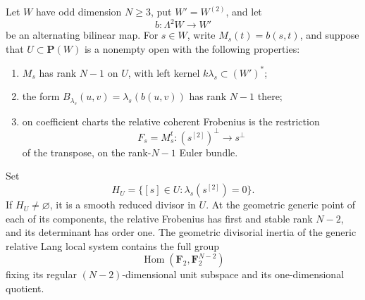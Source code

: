 \begin{proposition}
\label{prop:birational-Cartier-kernel-wall-inertia}
Let \(W\) have odd dimension \(N\ge3\), put \(W'=W^{(2)}\),
and let
\[
                  b:\Lambda^2W\longrightarrow W'
                                                        \tag{KWI5}
\]
be an alternating bilinear map.  For \(s\in W\), write
\(M_s(t)=b(s,t)\), and suppose that \(U\subset\mathbf P(W)\)
is a nonempty open with the following properties:
\begin{enumerate}
\item \(M_s\) has rank \(N-1\) on \(U\), with left kernel
      \(k\lambda_s\subset(W')^*\);
\item the form \(B_{\lambda_s}(u,v)=\lambda_s(b(u,v))\) has
      rank \(N-1\) there;
\item on coefficient charts the relative coherent Frobenius is
      the restriction
      \[
       F_s=M_s^t:(s^{[2]})^\perp\longrightarrow s^\perp
      \]
      of the transpose, on the rank-\(N-1\) Euler bundle.
\end{enumerate}
Set
\[
                  H_U=\{[s]\in U:\lambda_s(s^{[2]})=0\}.
                                                        \tag{KWI6}
\]
If \(H_U\ne\varnothing\), it is a smooth reduced divisor in
\(U\).  At the geometric generic point of each of its components,
the relative Frobenius has first and stable rank \(N-2\), and its
determinant has order one.  The geometric divisorial inertia of the
generic relative Lang local system contains the full group
\[
          \operatorname{Hom}(\mathbf F_2,\mathbf F_2^{N-2})
                                                        \tag{KWI7}
\]
fixing its regular \((N-2)\)-dimensional unit subspace and its
one-dimensional quotient.
\end{proposition}
